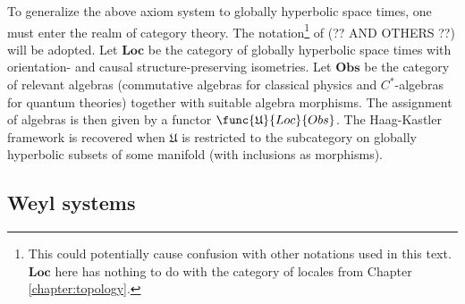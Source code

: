     To generalize the above axiom system to globally hyperbolic space times, one must enter the realm of category theory. The notation\footnote{This could potentially cause confusion with other notations used in this text. $\mathbf{Loc}$ here has nothing to do with the category of locales from Chapter \ref{chapter:topology}.} of \cite{cal_strobl} (?? AND OTHERS ??) will be adopted. Let $\mathbf{Loc}$ be the category of globally hyperbolic space times with orientation- and causal structure-preserving isometries. Let $\mathbf{Obs}$ be the category of relevant algebras (commutative algebras for classical physics and $C^*$-algebras for quantum theories) together with suitable algebra morphisms. The assignment of algebras is then given by a functor $\func{\mathfrak{U}}{Loc}{Obs}$. The Haag-Kastler framework is recovered when $\mathfrak{U}$ is restricted to the subcategory on globally hyperbolic subsets of some manifold (with inclusions as morphisms).

\subsection{Weyl systems}



